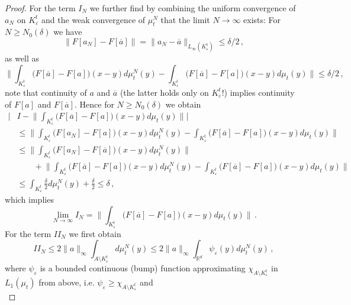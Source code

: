 \documentclass[A4paper,11pt]{article}
\theoremstyle{definition}
\newcommand{\R}{\mathbb{R}}
\begin{document}
\begin{proof}
	For the term $I_N$ we further find by combining the uniform convergence of $a_N$ on
	$K_\varepsilon^t$ and the weak convergence of $\mu_t^N$ that the limit $N\rightarrow\infty$ exists: For
	$N\geq N_0(\delta)$ we have
	\begin{equation*}
		\|F[a_N]-F[\overline a]\|
			=\|a_N-\overline a\|_{L_\infty(K_\varepsilon^t)}\leq\delta/2\,,
	\end{equation*}
	as well as
	\begin{equation*}
		\biggl\|\int_{K_\varepsilon^t}\bigl(F[\overline a]-F[a]\bigr)(x-y)d\mu^N_t(y)
			-\int_{K_\varepsilon^t}\bigl(F[\overline a]-F[a]\bigr)(x-y)d\mu_t(y)\biggr\|\leq\delta/2\,,
	\end{equation*}
	note that continuity of $a$ and $\overline a$ (the latter holds only on $K_\varepsilon^t$!) implies continuity of
	$F[a]$ and $F[\overline a]$. Hence for $N\geq N_0(\delta)$ we obtain
	\begin{align*}
		\Biggl|
			&I-\biggl\|\int_{K_\varepsilon^t}\bigl(F[\overline a]-F[a]\bigr)(x-y)d\mu_t(y)\biggr\|\Biggr|\\
			&\leq\biggl\|\int_{K_\varepsilon^t}\bigl(F[a_N]-F[a]\bigr)(x-y)d\mu^N_t(y)
					-\int_{K_\varepsilon^t}\bigl(F[\overline a]-F[a]\bigr)(x-y)d\mu_t(y)\biggr\|\\
			&\leq\Biggl\|\int_{K_\varepsilon^t}
				\bigl(F[a_N]-F[\overline a]\bigr)(x-y)d\mu_t^N(y)\Biggr\|\\
			&\qquad +\biggl\|\int_{K_\varepsilon^t}\bigl(F[\overline a]-F[a]\bigr)(x-y)d\mu^N_t(y)
					-\int_{K_\varepsilon^t}\bigl(F[\overline a]-F[a]\bigr)(x-y)d\mu_t(y)\biggr\|\\
			&\leq\int_{K_\varepsilon^t}\frac{\delta}{2}d\mu_t^N(y)+\frac{\delta}{2}\leq\delta\,,
	\end{align*}
	which implies
	\begin{equation*}
		\lim_{N\rightarrow\infty}I_N
			=\Biggl\|\int_{K_\varepsilon^t}\bigl(F[\overline a]-F[a]\bigr)(x-y)d\mu_t(y)\Biggr\|\,.
	\end{equation*}
	For the term $II_N$ we first obtain
	\begin{equation*}
		II_N\leq 2\|a\|_\infty\int_{A\setminus K_\varepsilon^t}d\mu_t^N(y)
			\leq 2\|a\|_\infty\int_{\R^d}\psi_\varepsilon(y)d\mu_t^N(y)\,,
	\end{equation*}
	where $\psi_\varepsilon$ is a bounded continuous (bump) function approximating
	$\chi_{A\setminus K_\varepsilon^t}$ in $L_1(\mu_t)$ from above, i.e.
	$\psi_\varepsilon\geq\chi_{A\setminus K_\varepsilon^t}$ and
	\begin{equation*}

\end{equation*}
\end{proof}
\end{document}
